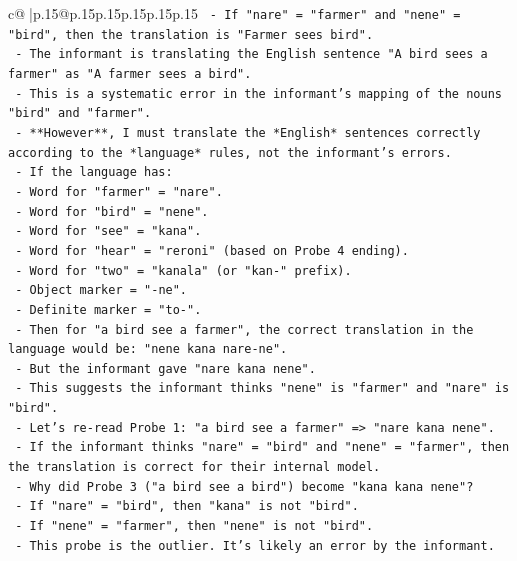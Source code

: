 \documentclass{article}
\begin{document}
{\begin{supertabular}{c@{$\;$}|p{.15\linewidth}@{}p{.15\linewidth}p{.15\linewidth}p{.15\linewidth}p{.15\linewidth}p{.15\linewidth}}
{{{\texttt{        {-} If "nare" = "farmer" and "nene" = "bird", then the translation is "Farmer sees bird".} \\
\texttt{        {-} The informant is translating the English sentence "A bird sees a farmer" as "A farmer sees a bird".} \\
\texttt{        {-} This is a systematic error in the informant's mapping of the nouns "bird" and "farmer".} \\
\texttt{        {-} **However**, I must translate the *English* sentences correctly according to the *language* rules, not the informant's errors.} \\
\texttt{        {-} If the language has:} \\
\texttt{          {-} Word for "farmer" = "nare".} \\
\texttt{          {-} Word for "bird" = "nene".} \\
\texttt{          {-} Word for "see" = "kana".} \\
\texttt{          {-} Word for "hear" = "reroni" (based on Probe 4 ending).} \\
\texttt{          {-} Word for "two" = "kanala" (or "kan{-}" prefix).} \\
\texttt{          {-} Object marker = "{-}ne".} \\
\texttt{          {-} Definite marker = "to{-}".} \\
\texttt{        {-} Then for "a bird see a farmer", the correct translation in the language would be: "nene kana nare{-}ne".} \\
\texttt{        {-} But the informant gave "nare kana nene".} \\
\texttt{        {-} This suggests the informant thinks "nene" is "farmer" and "nare" is "bird".} \\
\texttt{        {-} Let's re{-}read Probe 1: "a bird see a farmer" => "nare kana nene".} \\
\texttt{        {-} If the informant thinks "nare" = "bird" and "nene" = "farmer", then the translation is correct for their internal model.} \\
\texttt{        {-} Why did Probe 3 ("a bird see a bird") become "kana kana nene"?} \\
\texttt{          {-} If "nare" = "bird", then "kana" is not "bird".} \\
\texttt{          {-} If "nene" = "farmer", then "nene" is not "bird".} \\
\texttt{          {-} This probe is the outlier. It's likely an error by the informant.} \\
}}}
\end{supertabular}}
\end{document}
